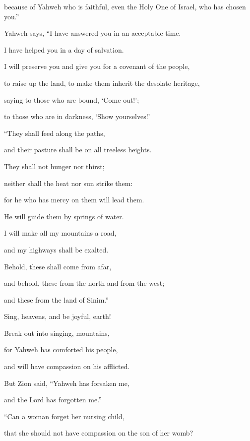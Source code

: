 {\par }{\QB because of Yahweh who is faithful, even the Holy One of Israel, who has chosen you.”
\par }{\BB \par }{\Q {}Yahweh says, “I have answered you in an acceptable time.
\par }{\QB I have helped you in a day of salvation.
\par }{\Q I will preserve you and give you for a covenant of the people,
\par }{\QB to raise up the land, to make them inherit the desolate heritage,
\par }{\Q {}saying to those who are bound, ‘Come out!’;
\par }{\QB to those who are in darkness, ‘Show yourselves!’
\par }{\Q “They shall feed along the paths,
\par }{\QB and their pasture shall be on all treeless heights.
\par }{\Q {}They shall not hunger nor thirst;
\par }{\QB neither shall the heat nor sun strike them:
\par }{\QB for he who has mercy on them will lead them.
\par }{\QB He will guide them by springs of water.
\par }{\Q {}I will make all my mountains a road,
\par }{\QB and my highways shall be exalted.
\par }{\Q {}Behold, these shall come from afar,
\par }{\QB and behold, these from the north and from the west;
\par }{\QB and these from the land of Sinim.”
\par }{\Q {}Sing, heavens, and be joyful, earth!
\par }{\QB Break out into singing, mountains,
\par }{\Q for Yahweh has comforted his people,
\par }{\QB and will have compassion on his afflicted.
\par }{\BB \par }{\Q {}But Zion said, “Yahweh has forsaken me,
\par }{\QB and the Lord has forgotten me.”
\par }{\Q {}“Can a woman forget her nursing child,
\par }{\QB that she should not have compassion on the son of her womb?
}
